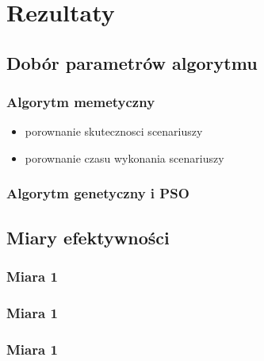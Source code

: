 \chapter{Rezultaty}
\section{Dobór parametrów algorytmu}
\subsection{Algorytm memetyczny}
\begin{itemize}
\item porownanie skutecznosci scenariuszy
\item porownanie czasu wykonania scenariuszy
\end{itemize}
\subsection{Algorytm genetyczny i PSO}
\section{Miary efektywności}
\subsection{Miara 1}
\subsection{Miara 1}
\subsection{Miara 1}